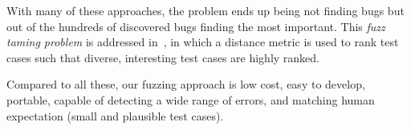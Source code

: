 With many of these approaches, the problem ends up being not finding bugs but out of the hundreds of discovered bugs finding the most important. This \emph{fuzz taming problem} is addressed in~\cite{Chen2013}, in which a distance metric is used to rank test cases such that diverse, interesting test cases are highly ranked.

Compared to all these, our fuzzing approach is low cost, easy to develop, portable, capable of detecting a wide range of errors, and matching human expectation (small and plausible test cases).







